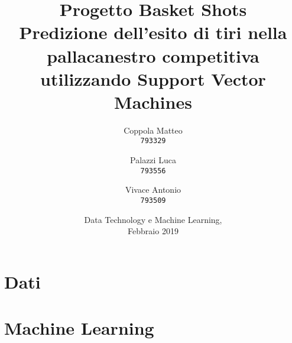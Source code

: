 \documentclass[12pt,a4paper]{report}
\begin{document}
\title{%
  \Huge Progetto Basket Shots\\
  \large Predizione dell'esito di tiri nella pallacanestro competitiva utilizzando Support Vector Machines\\
    }
\author{
  Coppola Matteo\\
  \texttt{793329}
  \and
  Palazzi Luca\\
  \texttt{793556}
   \and
  Vivace Antonio\\
  \texttt{793509}
}
\date{Data Technology e Machine Learning, \\ Febbraio 2019}
\maketitle

\tableofcontents


\chapter{Dati}



\chapter{Machine Learning}


\end{document}
